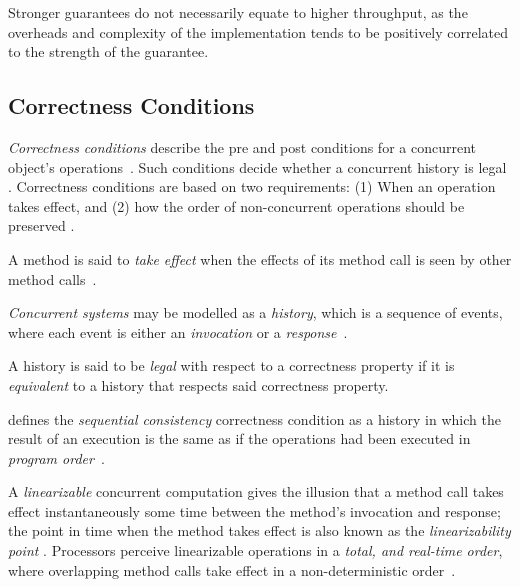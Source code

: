Stronger guarantees do not necessarily equate to higher throughput, as the
overheads and complexity of the implementation tends to be positively
correlated to the strength of the guarantee.

\subsection{Correctness Conditions}
\label{sec:correctness_conditions}
\emph{Correctness conditions} describe the pre and post conditions for a concurrent
object's operations~\citep{herlihy2020art}. Such conditions decide
whether a concurrent history is legal \citep{herlihy1990linearizability}.
Correctness conditions are based on two requirements: (1) When an
operation takes effect, and (2) how the order of non-concurrent operations
should be preserved \citep{herlihy1990linearizability}.

A method is said to \emph{take effect} when the effects of its method call is
seen by other method calls~\citep[Section~3.4.1]{herlihy2020art}. 

\emph{Concurrent systems} may be modelled as a \emph{history}, which is a
sequence of events, where each event is either an \emph{invocation} or a
\emph{response}~\citep[Section~3.6.1]{herlihy2020art}. 

A history is said to be \emph{legal} with respect to a correctness property if
it is \emph{equivalent} to a history that respects said correctness property.

\citeauthor{lamport1979make} defines the \emph{sequential consistency}
correctness condition as a history in which the result of an execution is the
same as if the operations had been executed in \emph{program
order}~\citep{lamport1979make}.

A \emph{linearizable} concurrent computation gives the illusion that a method
call takes effect instantaneously some time between the method's invocation and
response; the point in time when the method takes effect is also known as the
\emph{linearizability point} \citep{herlihy2020art,herlihy1990linearizability}.
Processors perceive linearizable operations in a \emph{total, and real-time
order}, where overlapping method calls take effect in a non-deterministic
order~\citep[Section~3.6.2]{herlihy2020art}.



